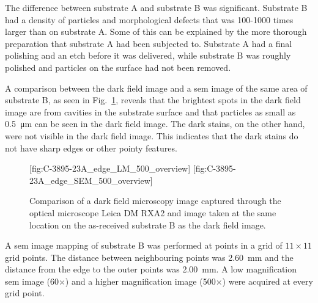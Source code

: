 The difference between substrate A and substrate B was significant. Substrate B had a density of particles and morphological defects that was 100-1000 times larger than on substrate A. Some of this can be explained by the more thorough preparation that substrate A had been subjected to. Substrate A had a final polishing and an etch before it was delivered, while substrate B was roughly polished and particles on the surface had not been removed.

A comparison between the dark field image and a \ac{sem} image of the same area of substrate B, as seen in Fig.~\ref{fig:LM_SEM_C3895}, reveals that the brightest spots in the dark field image are from cavities in the substrate surface and that particles as small as \SI{0.5}{\micro\metre} can be seen in the dark field image. The dark stains, on the other hand, were not visible in the dark field image. This indicates that the dark stains do not have sharp edges or other pointy features.

\begin{figure}[htbp]
    \centering
    [fig:C-3895-23A_edge_LM_500_overview]
    \hfill
    [fig:C-3895-23A_edge_SEM_500_overview]
    \caption[Comparison of dark field microscopy and \ac{sem} images.]{Comparison of  a dark field microscopy image captured through the optical microscope Leica DM RXA2 and   image taken at the same location on the as-received substrate B as the dark field image.}
    \label{fig:LM_SEM_C3895}
\end{figure}

A \ac{sem} image mapping of substrate B was performed at points in a grid of $11\times11$ grid points. The distance between neighbouring points was \SI{2.60}{\milli\metre} and the distance from the edge to the outer points was \SI{2.00}{\milli\metre}. A low magnification \ac{sem} image (60$\times$) and a higher magnification image (500$\times$) were acquired at every grid point. %

